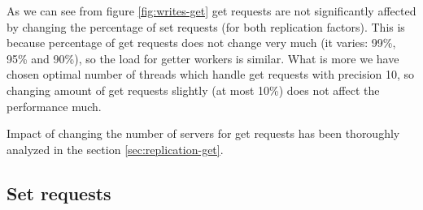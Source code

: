 \documentclass[11pt]{article}
\begin{document}
As we can see from figure \ref{fig:writes-get} get requests are not significantly affected by changing the percentage of set requests (for both replication factors). This is because percentage of get requests does not change very much (it varies: 99\%, 95\% and 90\%), so the load for getter workers is similar. What is more we have chosen optimal number of threads which handle get requests with precision 10, so changing amount of get requests slightly (at most 10\%) does not affect the performance much. 

Impact of changing the number of servers for get requests has been thoroughly analyzed in the section \ref{sec:replication-get}.

\subsection{Set requests}
\end{document}
